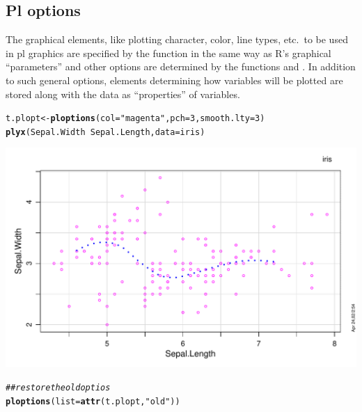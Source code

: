 \documentclass[11pt]{article}\usepackage[]{graphicx}\usepackage[]{color}
\makeatletter
\def\maxwidth{ %
  \ifdim\Gin@nat@width>\linewidth
    \linewidth
  \else
    \Gin@nat@width
  \fi
}
\newcommand{\hlnum}[1]{\textcolor[rgb]{0.686,0.059,0.569}{#1}}%
\newcommand{\hlstr}[1]{\textcolor[rgb]{0.192,0.494,0.8}{#1}}%
\newcommand{\hlcom}[1]{\textcolor[rgb]{0.678,0.584,0.686}{\textit{#1}}}%
\newcommand{\hlopt}[1]{\textcolor[rgb]{0,0,0}{#1}}%
\newcommand{\hlstd}[1]{\textcolor[rgb]{0.345,0.345,0.345}{#1}}%
\newcommand{\hlkwb}[1]{\textcolor[rgb]{0.69,0.353,0.396}{#1}}%
\newcommand{\hlkwc}[1]{\textcolor[rgb]{0.333,0.667,0.333}{#1}}%
\newcommand{\hlkwd}[1]{\textcolor[rgb]{0.737,0.353,0.396}{\textbf{#1}}}%
\newenvironment{kframe}{%
 \def\at@end@of@kframe{}%
 \ifinner\ifhmode%
  \def\at@end@of@kframe{\end{minipage}}%
  \begin{minipage}{\columnwidth}%
 \fi\fi%
 \def\FrameCommand##1{\hskip\@totalleftmargin \hskip-\fboxsep
 \colorbox{shadecolor}{##1}\hskip-\fboxsep
     \hskip-\linewidth \hskip-\@totalleftmargin \hskip\columnwidth}%
 \MakeFramed {\advance\hsize-\width
   \@totalleftmargin\z@ \linewidth\hsize
   \@setminipage}}%
 {\par\unskip\endMakeFramed%
 \at@end@of@kframe}
\newenvironment{knitrout}{}{} %
\makeatother
\begin{document}
\subsection{Pl options}
The graphical elements, like plotting character, color, line types, etc.\ 
to be used in pl graphics are specified by the function 
in the same way as R's graphical ``parameters'' and other options are 
determined by the functions \T{par} and \T{options}.
In addition to such general options, 
elements determining how variables will be plotted are stored along 
with the data as ``properties'' of variables.

\begin{knitrout}
\color{fgcolor}\begin{kframe}
\begin{alltt}
\hlstd{t.plopt} \hlkwb{<-} \hlkwd{ploptions}\hlstd{(}\hlkwc{col}\hlstd{=}\hlstr{"magenta"}\hlstd{,} \hlkwc{pch}\hlstd{=}\hlnum{3}\hlstd{,} \hlkwc{smooth.lty}\hlstd{=}\hlnum{3}\hlstd{)}
\hlkwd{plyx}\hlstd{(Sepal.Width}\hlopt{~}\hlstd{Sepal.Length,} \hlkwc{data}\hlstd{=iris)}
\end{alltt}
\end{kframe}
\includegraphics[width=\maxwidth]{figure/ploptions-1} 
\begin{kframe}\begin{alltt}
\hlcom{## restore the old optios}
\hlkwd{ploptions}\hlstd{(}\hlkwc{list}\hlstd{=}\hlkwd{attr}\hlstd{(t.plopt,} \hlstr{"old"}\hlstd{))}
\end{alltt}
\end{kframe}
\end{knitrout}
\end{document}
